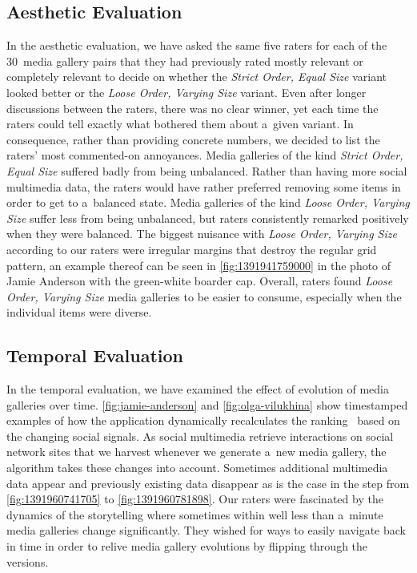 \documentclass{sig-alternate}
\begin{document}
\subsection{Aesthetic Evaluation}

In the aesthetic evaluation, we have asked the same five raters
for each of the 30~media gallery pairs
that they had previously rated mostly relevant or completely relevant
to decide on whether the \emph{Strict Order, Equal Size}
variant looked better or the \emph{Loose Order, Varying Size} variant.
Even after longer discussions between the raters,
there was no clear winner, yet each time the raters could tell exactly
what bothered them about a~given variant.
In consequence, rather than providing concrete numbers,
we decided to list the raters' most commented-on annoyances.
Media galleries of the kind \emph{Strict Order, Equal Size}
suffered badly from being unbalanced.
Rather than having more social multimedia data,
the raters would have rather preferred removing some items
in order to get to a~balanced state.
Media galleries of the kind \emph{Loose Order, Varying Size}
suffer less from being unbalanced,
but raters consistently remarked positively when they were balanced.
The biggest nuisance with \emph{Loose Order, Varying Size}
according to our raters were irregular margins
that destroy the regular grid pattern,
an example thereof can be seen in \autoref{fig:1391941759000}
in the photo of Jamie Anderson with the green-white boarder cap.
Overall, raters found \emph{Loose Order, Varying Size} media galleries
to be easier to consume, especially when the individual items were diverse.

\subsection{Temporal Evaluation}

In the temporal evaluation, we have examined the effect of 
evolution of media galleries over time.
\autoref{fig:jamie-anderson} and \autoref{fig:olga-vilukhina}
show timestamped examples of how the application
dynamically recalculates the ranking~\cite{steiner2013meteoroid}
based on the changing social signals.
As social multimedia retrieve interactions on social network sites
that we harvest whenever we generate a~new media gallery,
the algorithm takes these changes into account.
Sometimes additional multimedia data appear and
previously existing data disappear
as is the case in the step from \autoref{fig:1391960741705}
to \autoref{fig:1391960781898}.
Our raters were fascinated by the dynamics of the storytelling
where sometimes within well less than a~minute
media galleries change significantly.
They wished for ways to easily navigate back in time
in order to relive media gallery evolutions
by flipping through the versions.
\end{document}

